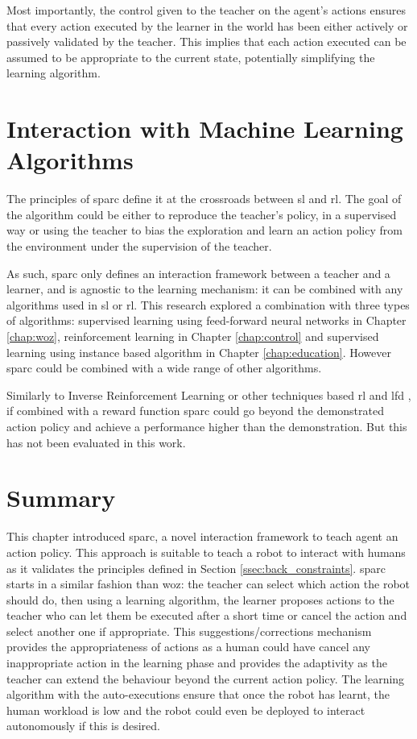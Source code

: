 Most importantly, the control given to the teacher on the agent's actions ensures that every action executed by the learner in the world has been either actively or passively validated by the teacher. This implies that each action executed can be assumed to be appropriate to the current state, potentially simplifying the learning algorithm.

\section{Interaction with Machine Learning Algorithms}

The principles of \gls{sparc} define it at the crossroads between \acrlong{sl} and \acrlong{rl}. The  goal of the algorithm could be either to reproduce the teacher's policy, in a supervised way or using the teacher to bias the exploration and learn an action policy from the environment under the supervision of the teacher.

As such, \gls{sparc} only defines an interaction framework between a teacher and a learner, and is agnostic to the learning mechanism: it can be combined with any algorithms used in \acrlong{sl} or \acrlong{rl}. This research explored a combination with three types of algorithms: supervised learning using feed-forward neural networks in Chapter \ref{chap:woz}, reinforcement learning in Chapter \ref{chap:control} and supervised learning using instance based algorithm in Chapter \ref{chap:education}. However \gls{sparc} could be combined with a wide range of other algorithms.


Similarly to Inverse Reinforcement Learning \citep{abbeel2004apprenticeship} or other techniques based \gls{rl} and \gls{lfd} \citep{billard2008robot}, if combined with a reward function \gls{sparc} could go beyond the demonstrated action policy and achieve a performance higher than the demonstration. But this has not been evaluated in this work.

\section{Summary}
    
This chapter introduced \acrfull{sparc}, a novel interaction framework to teach agent an action policy. This approach is suitable to teach a robot to interact with humans as it validates the principles defined in Section \ref{ssec:back_constraints}. \gls{sparc} starts in a similar fashion than \gls{woz}: the teacher can select which action the robot should do, then using a learning algorithm, the learner proposes actions to the teacher who can let them be executed after a short time or cancel the action and select another one if appropriate. This suggestions/corrections mechanism provides the appropriateness of actions as a human could have cancel any inappropriate action in the learning phase and provides the adaptivity as the teacher can extend the behaviour beyond the current action policy. The learning algorithm with the auto-executions ensure that once the robot has learnt, the human workload is low and the robot could even be deployed to interact autonomously if this is desired.


